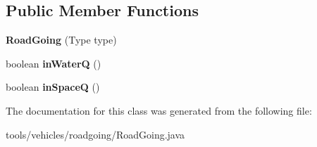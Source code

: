 \subsection*{Public Member Functions}
\begin{DoxyCompactItemize}
\item 
{\bfseries Road\+Going} (Type type)\hypertarget{classtools_1_1vehicles_1_1roadgoing_1_1_road_going_ae50060cdd3df5a67e711aebd77218e1d}{}\label{classtools_1_1vehicles_1_1roadgoing_1_1_road_going_ae50060cdd3df5a67e711aebd77218e1d}

\item 
boolean {\bfseries in\+WaterQ} ()\hypertarget{classtools_1_1vehicles_1_1roadgoing_1_1_road_going_a0113fbef812abadfe547b0e625824d78}{}\label{classtools_1_1vehicles_1_1roadgoing_1_1_road_going_a0113fbef812abadfe547b0e625824d78}

\item 
boolean {\bfseries in\+SpaceQ} ()\hypertarget{classtools_1_1vehicles_1_1roadgoing_1_1_road_going_ad7340d6b3b91e565a71b8c3c396f0a75}{}\label{classtools_1_1vehicles_1_1roadgoing_1_1_road_going_ad7340d6b3b91e565a71b8c3c396f0a75}

\end{DoxyCompactItemize}


The documentation for this class was generated from the following file\+:\begin{DoxyCompactItemize}
\item 
tools/vehicles/roadgoing/Road\+Going.\+java\end{DoxyCompactItemize}
